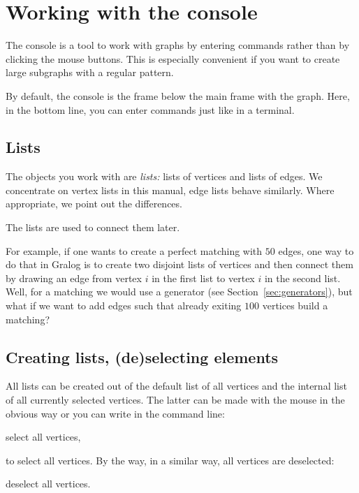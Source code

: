 \section{Working with the console}

The console is a tool to work with graphs by entering commands rather
than by clicking the mouse buttons. This is especially convenient if
you want to create large subgraphs with a regular pattern.

By default, the console is the frame below the main frame with the
graph. Here, in the bottom line, you can enter commands just like in a
terminal.

\subsection{Lists}

The objects you work with are \emph{lists:} lists of vertices and
lists of edges. We concentrate on vertex lists in this manual, edge
lists behave similarly. Where appropriate, we point out the
differences.

The lists are used to connect them later.


\begin{example}
  For example, if one wants to create a perfect matching with $50$
  edges, one way to do that in Gralog is to create two disjoint lists
  of vertices and then connect them by drawing an edge from vertex $i$
  in the first list to vertex $i$ in the second list. Well, for a
  matching we would use a generator (see
  Section~\ref{sec:generators}), but what if we want to add edges such
  that already exiting $100$ vertices build a matching?
  \label{ex:running}
\end{example}


\subsection{Creating lists, (de)selecting elements}

All lists can be created out of the default list of all
vertices and the internal list of all currently selected vertices. The
latter can be made with the mouse in the obvious way or you can write
in the command line:
\begin{tcolorbox}
  select all vertices,
\end{tcolorbox}
\noindent
to select all vertices. By the way, in a similar way, all vertices are
deselected:

\begin{tcolorbox}
deselect all vertices.
\end{tcolorbox}

